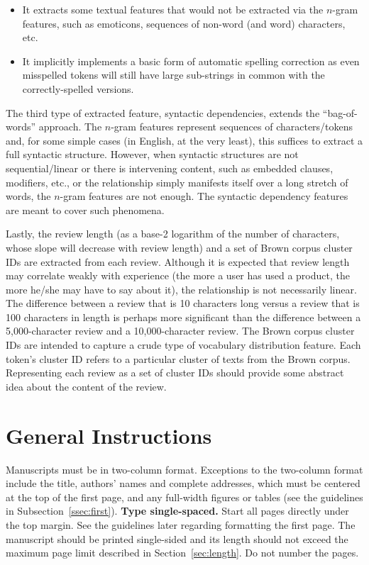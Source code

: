 \documentclass[9pt]{article}
\begin{document}
\begin{itemize}
\item It extracts some textual features that would not be extracted via the $n$-gram features, such as emoticons, sequences of non-word (and word) characters, etc.
\item It implicitly implements a basic form of automatic spelling correction as even misspelled tokens will still have large sub-strings in common with the correctly-spelled versions.
\end{itemize}

The third type of extracted feature, syntactic dependencies, extends the ``bag-of-words'' approach. The $n$-gram features represent sequences of characters/tokens and, for some simple cases (in English, at the very least), this suffices to extract a full syntactic structure. However, when syntactic structures are not sequential/linear or there is intervening content, such as embedded clauses, modifiers, etc., or the relationship simply manifests itself over a long stretch of words, the $n$-gram features are not enough. The syntactic dependency features are meant to cover such phenomena.

Lastly, the review length (as a base-2 logarithm of the number of characters, whose slope will decrease with review length) and a set of Brown corpus cluster IDs are extracted from each review. Although it is expected that review length may correlate weakly with experience (the more a user has used a product, the more he/she may have to say about it), the relationship is not necessarily linear. The difference between a review that is 10 characters long versus a review that is 100 characters in length is perhaps more significant than the difference between a 5,000-character review and a 10,000-character review. The Brown corpus cluster IDs are intended to capture a crude type of vocabulary distribution feature. Each token's cluster ID refers to a particular cluster of texts from the Brown corpus. Representing each review as a set of cluster IDs should provide some abstract idea about the content of the review.

\section{General Instructions}

Manuscripts must be in two-column format.  Exceptions to the
two-column format include the title, authors' names and complete
addresses, which must be centered at the top of the first page, and
any full-width figures or tables (see the guidelines in
Subsection~\ref{ssec:first}). {\bf Type single-spaced.}  Start all
pages directly under the top margin. See the guidelines later
regarding formatting the first page.  The manuscript should be
printed single-sided and its length
should not exceed the maximum page limit described in Section~\ref{sec:length}.
Do not number the pages.
\end{document}
